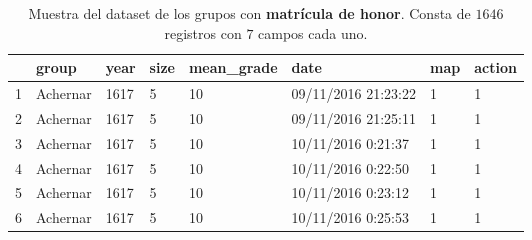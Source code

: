 \documentclass[10pt,a4paper]{article}
\begin{document}
\begin{table}[ht]
\centering
\begin{tabular}{rlllllll}
  \hline
 & group & year & size & mean\_grade & date & map & action \\ 
  \hline
1 & Achernar & 1617 & 5 & 10 & 09/11/2016 21:23:22 & 1 & 1 \\ 
  2 & Achernar & 1617 & 5 & 10 & 09/11/2016 21:25:11 & 1 & 1 \\ 
  3 & Achernar & 1617 & 5 & 10 & 10/11/2016 0:21:37  & 1 & 1 \\ 
  4 & Achernar & 1617 & 5 & 10 & 10/11/2016 0:22:50  & 1 & 1 \\ 
  5 & Achernar & 1617 & 5 & 10 & 10/11/2016 0:23:12  & 1 & 1 \\ 
  6 & Achernar & 1617 & 5 & 10 & 10/11/2016 0:25:53  & 1 & 1 \\ 
   \hline
\end{tabular}
\caption{Muestra del dataset de los grupos con \textbf{matrícula de honor}. Consta de $1646$ registros con $7$ campos cada uno.}
\label{table:15}
\end{table}
\end{document}
